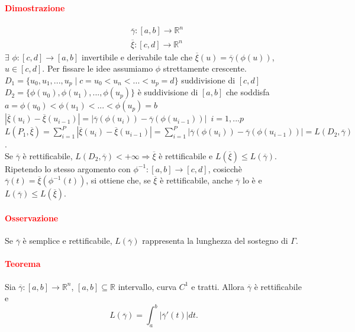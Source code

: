 \documentclass{article}
\newcommand{\R}{\mathbb{R}}
\begin{document}
\paragraph{\textcolor{red}{Dimostrazione}}
\begin{align*}
    &\overline{\gamma}:[a,b]\rightarrow \R^n\\
    &\overline{\xi}:[c,d]\rightarrow \R^n
\end{align*}
$\exists \,\,\phi: [c,d]\rightarrow [a,b]$ invertibile e derivabile tale che $\overline{\xi}(u)=\overline{\gamma}(\phi(u))$, $u \in [c,d]$. Per fissare le idee assumiamo $\phi$ strettamente crescente.\\
$D_1=\{ u_0,u_1,...,u_p \mid c=u_0<u_n<...<u_p=d \}$ suddivisione di $[c,d]$\\
$D_2=\{\phi(u_0),\phi(u_1),...,\phi(u_p)\}$ è suddivisione di $[a,b]$ che soddisfa $a = \phi (u_0)<\phi(u_1)<...<\phi(u_p)=b$\\
$|\overline{\xi} (u_i)-\overline{\xi}(u_{i-1})|=|\overline{\gamma}(\phi(u_i))-\overline{\gamma}(\phi(u_{i-1}))|\,\,\, i=1,...p$\\
$L(P_1,\overline{\xi})=\sum_{i=1}^P|\overline{\xi}(u_i)-\overline{\xi}(u_{i-1})|=\sum_{i=1}^P|\overline{\gamma}(\phi(u_i))-\overline{\gamma}(\phi(u_{i-1}))|=L(D_2,\overline{\gamma})$.\\
Se $\overline{\gamma}$ è rettificabile, $L(D_2,\overline{\gamma})< +\infty \Rightarrow \overline{\xi}$ è rettificabile e $L(\overline{\xi})\leq L(\overline{\gamma})$.\\
Ripetendo lo stesso argomento con $\phi^{-1}:[a,b]\rightarrow [c,d]$, cosicchè $\overline{\gamma}(t)=\overline{\xi}(\phi^{-1}(t))$, si ottiene che, se $\overline{\xi}$ è rettificabile, anche $\overline{\gamma}$ lo è e $L(\overline{\gamma})\leq L(\overline{\xi})$.
\begin{flushright}
    \Lightning
\end{flushright}

\paragraph{\textcolor{red}{Osservazione}}
Se $\overline{\gamma}$ è semplice e rettificabile, $L(\overline{\gamma})$ rappresenta la lunghezza del sostegno di $\Gamma$.

\paragraph{\textcolor{red}{Teorema}}
Sia $\overline{\gamma}:[a,b]\rightarrow \R^n$, $[a,b] \subseteq \R$ intervallo, curva $C^1$ e tratti. Allora $\overline{\gamma}$ è rettificabile e 
\begin{equation*}
    L(\overline{\gamma})=\int_{a}^{b}|\overline{\gamma}'(t)|dt.
\end{equation*}
\end{document}
